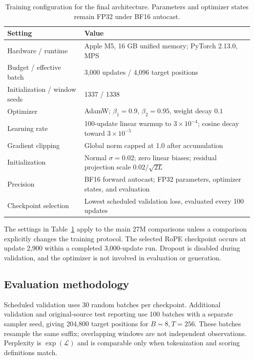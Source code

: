 \documentclass{article}
\begin{document}
\begin{table}[ht]
\caption{Training configuration for the final architecture. Parameters and optimizer states remain FP32 under BF16 autocast.}
\label{tab:recipe}\centering\small
\begin{tabularx}{\linewidth}{lX}
\toprule Setting & Value \\
\midrule
Hardware / runtime & Apple M5, 16 GB unified memory; PyTorch 2.13.0, MPS \\
Budget / effective batch & 3,000 updates / 4,096 target positions \\
Initialization / window seeds & 1337 / 1338 \\
Optimizer & AdamW; $\beta_1=0.9$, $\beta_2=0.95$, weight decay $0.1$ \\
Learning rate & 100-update linear warmup to $3\times10^{-4}$; cosine decay toward $3\times10^{-5}$ \\
Gradient clipping & Global norm capped at 1.0 after accumulation \\
Initialization & Normal $\sigma=0.02$; zero linear biases; residual projection scale $0.02/\sqrt{2L}$ \\
Precision & BF16 forward autocast; FP32 parameters, optimizer states, and evaluation \\
Checkpoint selection & Lowest scheduled validation loss, evaluated every 100 updates \\
\bottomrule
\end{tabularx}
\end{table}

The settings in Table~\ref{tab:recipe} apply to the main 27M comparisons unless a comparison explicitly changes the training protocol. The selected RoPE checkpoint occurs at update 2,900 within a completed 3,000-update run. Dropout is disabled during validation, and the optimizer is not involved in evaluation or generation.

\subsection{Evaluation methodology}
\label{sec:metrics}
Scheduled validation uses 30 random batches per checkpoint. Additional validation and original-source test reporting use 100 batches with a separate sampler seed, giving 204,800 target positions for $B=8,T=256$. These batches resample the same suffix; overlapping windows are not independent observations. Perplexity is $\exp(\mathcal{L})$ and is comparable only when tokenization and scoring definitions match.
\end{document}

